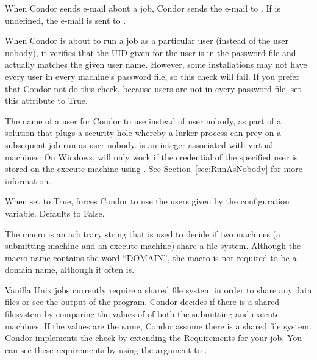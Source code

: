 \begin{description}
When Condor sends e-mail about a job, Condor sends the e-mail to
.
If 
is undefined, the e-mail is sent to .


\item[\Macro{SOFT\_UID\_DOMAIN}] \label{param:SoftUidDomain}
When Condor is about to run a job as a particular user (instead of the
user nobody), it verifies that the UID given for the user is in the
password file and actually matches the given user name.
However, some
installations may not have every user in every machine's password
file, so this check will fail. If you prefer that Condor not do
this check, because users are not in every password file, set
this attribute to True.


\item[\Macro{VMx\_USER}] \label{param:VMxUser}
The name of a user for Condor to use instead of
user nobody,
as part of a solution that plugs a security hole whereby
a lurker process can prey on a subsequent job run as user
nobody. 
 is an integer associated with virtual machines.
On Windows, 
will only work if the credential of the specified
user is stored on the execute machine using .
See Section~\ref{sec:RunAsNobody} for more information.

\item[\Macro{EXECUTE\_LOGIN\_IS\_DEDICATED}]
\label{param:ExecuteLoginIsDedicated}
When set to True,
forces Condor to use the users given by the 
configuration variable.
Defaults to False.

\item[\Macro{FILESYSTEM\_DOMAIN}] \label{param:FilesystemDomain}
The 
macro is an arbitrary string that is used to decide if
two machines (a submitting machine and an execute machine) share a
file system.
Although the macro name contains the word ``DOMAIN'',
the macro is not required to be a domain name, although it often is.

Vanilla Unix jobs currently require a shared file system in order to
share any data files or see the output of the program.
Condor decides if there is a shared filesystem by comparing the values
of 
of both the submitting and execute machines.
If the values are the same,
Condor assume there is a shared file system.
Condor implements the check
by extending the Requirements for your job.
You can see these requirements by using the  argument
to .


\end{description}
